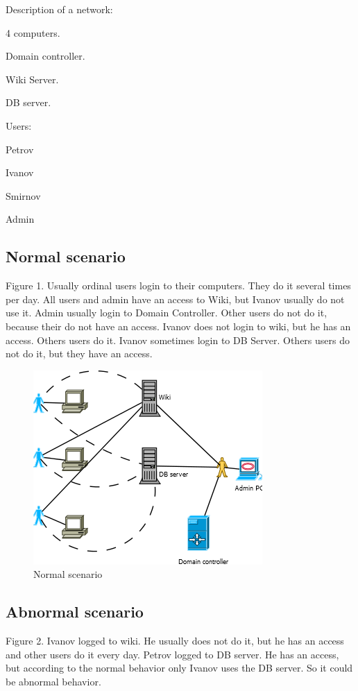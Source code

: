 \documentclass{article}
\begin{document}
Description of a network:
\begin{compactitem}
\item 4 computers.
\item Domain controller. 
\item Wiki Server.
\item DB server.
\end{compactitem}
Users: 
\begin{compactitem}
\item Petrov
\item Ivanov 
\item Smirnov
\item Admin
\end{compactitem}
     
\subsection{Normal scenario}
Figure 1. Usually ordinal users login to their computers. They do it several times per day. All users and admin have an access to Wiki, but Ivanov usually do not use it. Admin usually login to Domain Controller. Other users do not do it, because their do not have an access. Ivanov does not login to wiki, but he has an access. Others users do it. Ivanov sometimes login to DB Server. Others users do not do it, but they have an access.
\begin{figure}[ht!]
\centering
\includegraphics{scenario_normal.png}
\caption{Normal scenario}
\label{overflow}
\end{figure}

\subsection{Abnormal scenario}
Figure 2. Ivanov logged to wiki. He usually does not do it, but he has an access and other users do it every day. Petrov logged to DB server. He has an access, but according to the normal behavior only Ivanov uses the DB server. So it could be abnormal behavior.  
\end{document}

